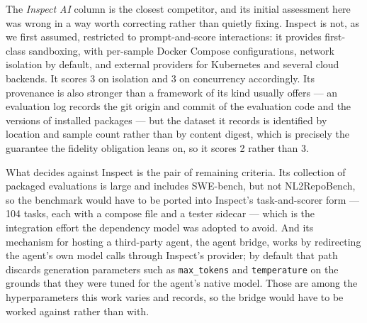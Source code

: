 The \emph{Inspect AI} column is the closest competitor, and its initial
assessment here was wrong in a way worth correcting rather than quietly fixing.
Inspect is not, as we first assumed, restricted to prompt-and-score
interactions: it provides first-class sandboxing, with per-sample Docker
Compose configurations, network isolation by default, and external providers
for Kubernetes and several cloud backends. It scores 3 on isolation and 3 on
concurrency accordingly. Its provenance is also stronger than a framework of
its kind usually offers --- an evaluation log records the git origin and commit
of the evaluation code and the versions of installed packages --- but the
dataset it records is identified by location and sample count rather than by
content digest, which is precisely the guarantee the fidelity obligation leans
on, so it scores 2 rather than 3.

What decides against Inspect is the pair of remaining criteria. Its collection
of packaged evaluations is large and includes SWE-bench, but not NL2RepoBench,
so the benchmark would have to be ported into Inspect's task-and-scorer form
--- 104 tasks, each with a compose file and a tester sidecar --- which is the
integration effort the dependency model was adopted to avoid. And its mechanism
for hosting a third-party agent, the agent bridge, works by redirecting the
agent's own model calls through Inspect's provider; by default that path
discards generation parameters such as \texttt{max\_tokens} and
\texttt{temperature} on the grounds that they were tuned for the agent's native
model. Those are among the hyperparameters this work varies and records, so the
bridge would have to be worked against rather than with.




